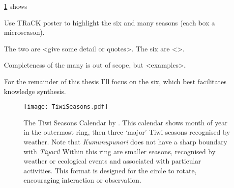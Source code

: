 \ref{fig:tiwi-seasons} shows 

Use TRaCK poster to highlight the six and many seasons (each box a microseason).

The two are <give some detail or quotes>.
The six are <>.

Completeness of the many is out of scope, but <examples>.  

For the remainder of this thesis I'll focus on the six, which best facilitates knowledge synthesis.



\begin{landscape}
\begin{figure}[p]
    \centering
    \texttt{[image: TiwiSeasons.pdf]}
    \caption[The Tiwi Seasons Calendar by \citet{CSIROcals}]{
        The Tiwi Seasons Calendar by \citet{CSIROcals}.
        This calendar shows month of year in the outermost ring,
        then three `major' Tiwi seasons recognised by weather.
        Note that \textit{Kumunupunari} does not have a sharp boundary with \textit{Tiyari}!
        Within this ring are smaller seasons, recognised by weather
        or ecological events and associated with particular activities.
        This format is designed for the circle to rotate, encouraging interaction or observation.
        }
    \label{fig:tiwi-seasons}
\end{figure}
\end{landscape}


